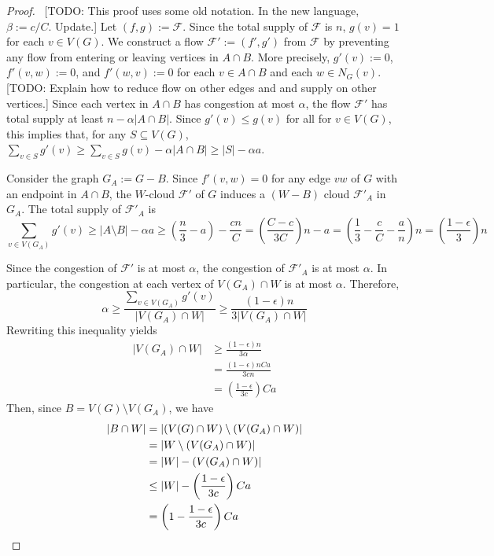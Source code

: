 \documentclass{patmorin}
\begin{document}
\begin{proof}
  \ [TODO: This proof uses some old notation.  In the new language, $\beta:=c/C$. Update.]
  Let $(f,g):=\mathcal{F}$.  Since the total supply of $\mathcal{F}$ is $n$, $g(v)=1$ for each $v\in V(G)$.  We construct a flow $\mathcal{F}':=(f',g')$  from $\mathcal{F}$ by preventing any flow from entering or leaving vertices in $A\cap B$.  More precisely, $g'(v):=0$, $f'(v,w):=0$, and $f'(w,v):=0$ for each $v\in A\cap B$ and each $w\in N_G(v)$.  [TODO: Explain how to reduce flow on other edges and and supply on other vertices.]   Since each vertex in $A\cap B$ has congestion at most $\alpha$, the flow $\mathcal{F}'$ has total supply at least $n-\alpha|A\cap B|$.  Since $g'(v)\le g(v)$ for all for $v\in V(G)$, this implies that, for any $S\subseteq V(G)$, $\sum_{v\in S} g'(v)\ge \sum_{v\in S}g(v) - \alpha|A\cap B|\ge |S| - \alpha a$.

  Consider the graph $G_A:=G-B$.  Since $f'(v,w)=0$ for any edge $vw$ of $G$ with an endpoint in $A\cap B$, the $W$-cloud $\mathcal{F}'$ of $G$ induces a $(W-B)$ cloud $\mathcal{F}'_A$ in $G_A$.  The total supply of $\mathcal{F}'_A$ is
  \[
     \sum_{v\in V(G_A)} g'(v) \ge |A\setminus B| -\alpha a \ge \left(\frac{n}{3}-a\right) - \frac{{c}n}{C} = \left(\frac{C-c}{3C}\right)n - a = \left(\frac{1}{3}-\frac{c}{C}-\frac{a}{n}\right)n
     = \left(\frac{1-\epsilon}{3}\right)n
  \]

  Since the congestion of $\mathcal{F}'$ is at most $\alpha$, the congestion of $\mathcal{F}'_A$ is at most $\alpha$.  In particular, the congestion at each vertex of $V(G_A)\cap W$ is at most $\alpha$.  Therefore,
  \[
     \alpha \ge \frac{\sum_{v\in V(G_A)} g'(v)}{|V(G_A)\cap W|}
     \ge \frac{(1-\epsilon)n}{3|V(G_A)\cap W|}
  \]
  Rewriting this inequality yields
  \begin{align*}
    |V(G_A)\cap W|
    & \ge \frac{(1-\epsilon)n}{3\alpha}\\
    & = \frac{(1-\epsilon)nCa}{3cn}\\
    & = \left(\frac{1-\epsilon}{3c}\right) Ca
  \end{align*}
  Then, since $B=V(G)\setminus V(G_A)$, we have
  \begin{align*}
    |B\cap W|
      & = |(V(G)\cap W)\setminus(V(G_A)\cap W)| \\
      & = |W\setminus(V(G_A)\cap W)| \\
      & = |W|-(V(G_A)\cap W)| \\
      & \le |W|-\left(\frac{1-\epsilon}{3c}\right)Ca \\
      & = \left(1-\frac{1-\epsilon}{3c}\right)Ca \qedhere
  \end{align*}
\end{proof}
\end{document}
